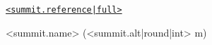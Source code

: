 \begin{minipage}{\textwidth}\centering
\fontsize{25pt}{0pt}\selectfont \href{https://summits.sota.org.uk/summit/<summit.reference|full>}{\texttt{<summit.reference|full>}}\par
\fontsize{10pt}{0pt}\selectfont <summit.name> (<summit.alt|round|int> m)\par
\end{minipage}\par
